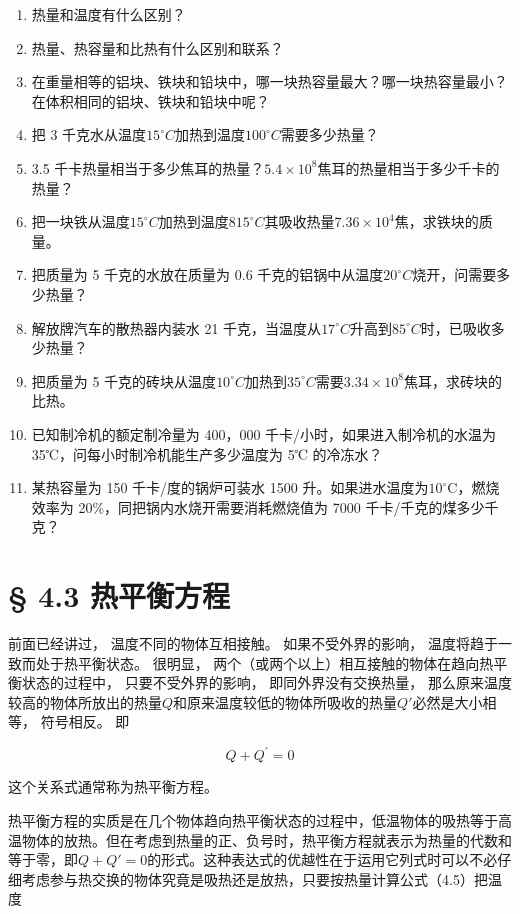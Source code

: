 \begin{enumerate}
\def\labelenumi{\arabic{enumi}.}
\item
  热量和温度有什么区别？
\item
  热量、热容量和比热有什么区别和联系？
\item
  在重量相等的铝块、铁块和铅块中，哪一块热容量最大？哪一块热容量最小？在体积相同的铝块、铁块和铅块中呢？
\item
  把 3
  千克水从温度\(15^{\circ}C\)加热到温度\(100^{\circ}C\)需要多少热量？
\item
  3.5
  千卡热量相当于多少焦耳的热量？\(5.4 \times 10^{8}\)焦耳的热量相当于多少千卡的热量？
\item
  把一块铁从温度\(15^{\circ}C\)加热到温度\(815^{\circ}C\)其吸收热量\(7.36 \times 10^{4}\)焦，求铁块的质量。
\item
  把质量为 5 千克的水放在质量为 0.6
  千克的铝锅中从温度\(20^{\circ}C\)烧开，问需要多少热量？
\item
  解放牌汽车的散热器内装水 21
  千克，当温度从\(17^{\circ}C\)升高到\(85^{\circ}C\)时，已吸收多少热量？
\item
  把质量为 5
  千克的砖块从温度\(10^{\circ}C\)加热到\(35^{\circ}C\)需要\(3.34 \times 10^{8}\)焦耳，求砖块的比热。
\item
  已知制冷机的额定制冷量为 400，000 千卡/小时，如果进入制冷机的水温为
  35℃，问每小时制冷机能生产多少温度为 5℃ 的冷冻水？
\item
  某热容量为 150 千卡/度的锅炉可装水 1500
  升。如果进水温度为\(10^{\circ}\)C，燃烧效率为
  20\%，同把锅内水烧开需要消耗燃烧值为 7000 千卡/千克的煤多少千克？
\end{enumerate}

\section{§ 4.3 热平衡方程}\label{ux70edux5e73ux8861ux65b9ux7a0b}

前面已经讲过， 温度不同的物体互相接触。 如果不受外界的影响，
温度将趋于一致而处于热平衡状态。 很明显，
两个（或两个以上）相互接触的物体在趋向热平衡状态的过程中，
只要不受外界的影响， 即同外界没有交换热量，
那么原来温度较高的物体所放出的热量\(Q\)和原来温度较低的物体所吸收的热量\(Q'\)必然是大小相等，
符号相反。 即

\[
Q + Q ^ {\prime} = 0 \tag {4.6}
\]

这个关系式通常称为热平衡方程。

热平衡方程的实质是在几个物体趋向热平衡状态的过程中，低温物体的吸热等于高温物体的放热。但在考虑到热量的正、负号时，热平衡方程就表示为热量的代数和等于零，即\(Q+Q'=0\)的形式。这种表达式的优越性在于运用它列式时可以不必仔细考虑参与热交换的物体究竟是吸热还是放热，只要按热量计算公式（4.5）把温度


